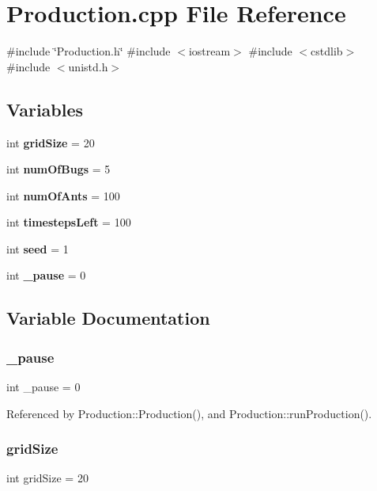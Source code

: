 \section{Production.\+cpp File Reference}
\label{Production_8cpp}
{\ttfamily \#include \char`\"{}Production.\+h\char`\"{}}\newline
{\ttfamily \#include $<$iostream$>$}\newline
{\ttfamily \#include $<$cstdlib$>$}\newline
{\ttfamily \#include $<$unistd.\+h$>$}\newline
\subsection*{Variables}
\begin{DoxyCompactItemize}
\item 
int \textbf{ grid\+Size} = 20
\item 
int \textbf{ num\+Of\+Bugs} = 5
\item 
int \textbf{ num\+Of\+Ants} = 100
\item 
int \textbf{ timesteps\+Left} = 100
\item 
int \textbf{ seed} = 1
\item 
int \textbf{ \+\_\+pause} = 0
\end{DoxyCompactItemize}


\subsection{Variable Documentation}
\mbox{\label{Production_8cpp_abdf61b2c15089b9b0444f1a23ce9fe98}} 
\subsubsection{\+\_\+pause}
{\footnotesize\ttfamily int \+\_\+pause = 0}



Referenced by Production\+::\+Production(), and Production\+::run\+Production().

\mbox{\label{Production_8cpp_a4b16bb042891838996c6db35e71e951b}} 
\subsubsection{grid\+Size}
{\footnotesize\ttfamily int grid\+Size = 20}




